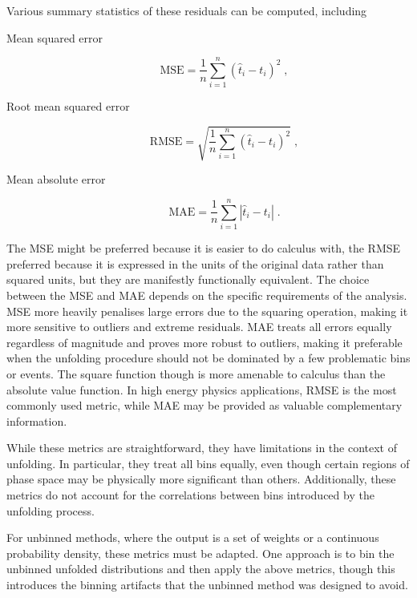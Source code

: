             Various summary statistics of these residuals can be computed, including
            \begin{description}
                \item[Mean squared error] \[\text{MSE} = \frac{1}{n}\sum_{i=1}^{n}(\hat{t}_i - t_i)^2\;,\]
                \item[Root mean squared error] \[\text{RMSE} = \sqrt{\frac{1}{n}\sum_{i=1}^{n}(\hat{t}_i - t_i)^2}\;,\] 
                \item[Mean absolute error] \[\text{MAE} = \frac{1}{n}\sum_{i=1}^{n}|\hat{t}_i - t_i|\;.\]
                
            \end{description}

            The MSE might be preferred because it is easier to do calculus with, the RMSE preferred because it is expressed in the units of the original data rather than squared units, but they are manifestly functionally equivalent.
            The choice between the MSE and MAE depends on the specific requirements of the analysis.
            MSE more heavily penalises large errors due to the squaring operation, making it more sensitive to outliers and extreme residuals.
            MAE treats all errors equally regardless of magnitude and proves more robust to outliers, making it preferable when the unfolding procedure should not be dominated by a few problematic bins or events.
            The square function though is more amenable to calculus than the absolute value function.
            In high energy physics applications, RMSE is the most commonly used metric, while MAE may be provided as valuable complementary information.
            
            While these metrics are straightforward, they have limitations in the context of unfolding.
            In particular, they treat all bins equally, even though certain regions of phase space may be physically more significant than others.
            Additionally, these metrics do not account for the correlations between bins introduced by the unfolding process.
            
            For unbinned methods, where the output is a set of weights or a continuous probability density, these metrics must be adapted.
            One approach is to bin the unbinned unfolded distributions and then apply the above metrics, though this introduces the binning artifacts that the unbinned method was designed to avoid.

